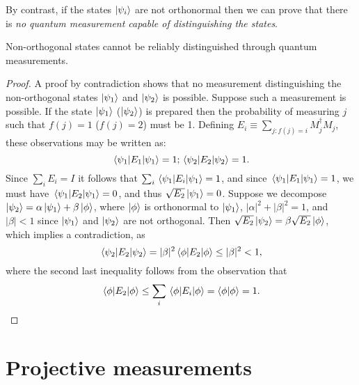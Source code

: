 By contrast, if the states $\ket{\psi_i}$ are not orthonormal then we can prove
that there is \emph{no quantum measurement capable of distinguishing the
states}.

\begin{theorem}
  Non-orthogonal states cannot be reliably distinguished through quantum
  measurements.
\end{theorem}

\begin{proof}
  A proof by contradiction shows that no measurement distinguishing the
  non-orthogonal states $\ket{\psi_1}$ and $\ket{\psi_2}$ is possible. Suppose
  such a measurement is possible. If the state $\ket{\psi_1}$ ($\ket{\psi_2}$)
  is prepared then the probability of measuring $j$ such that $f(j) = 1$ ($f(j)
  = 2$) must be 1. Defining $E_i \equiv \sum_{j: f(j) = i}M_j^\dagger M_j$,
  these observations may be written as: \begin{equation*}
    \mel{\psi_1}{E_1}{\psi_1} = 1; \mel{\psi_2}{E_2}{\psi_2} = 1.
  \end{equation*}
  Since $\sum_iE_i = I$ it follows that $\sum_i\mel{\psi_1}{E_i}{\psi_1} = 1$,
  and since $\mel{\psi_1}{E_1}{\psi_1} = 1$, we must have $\mel{\psi_1}{E_2}
  {\psi_1} = 0$, and thus $\sqrt{E_2}\ket{\psi_1} = 0$. Suppose we decompose
  $\ket{\psi_2} = \alpha\ket{\psi_1} + \beta\ket{\phi}$, where $\ket{\phi}$ is
  orthonormal to $\ket{\psi_1}$, $|\alpha|^2 + |\beta|^2 = 1$, and $|\beta| <
  1$ since $\ket{\psi_1}$ and $\ket{\psi_2}$ are not orthogonal. Then
  $\sqrt{E_2}\ket{\psi_2} = \beta\sqrt{E_2}\ket{\phi}$, which implies a
  contradiction, as \begin{equation*}
    \mel{\psi_2}{E_2}{\psi_2} = |\beta|^2\mel{\phi}{E_2}{\phi} \leq |\beta|^2
      < 1,
  \end{equation*} where the second last inequality follows from the observation
  that \begin{equation*}
    \mel{\phi}{E_2}{\phi} \leq \sum_i\mel{\phi}{E_i}{\phi} = \braket{\phi}
      {\phi} = 1.
  \end{equation*}
\end{proof}

\section{Projective measurements}

